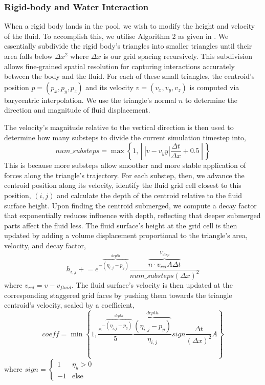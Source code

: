 \subsubsection{Rigid-body and Water Interaction}
When a rigid body lands in the pool, we wish to modify the height and velocity of the fluid.
To accomplish this, we utilise Algorithm 2 as given in \cite{hfluid}.
We essentially subdivide the rigid body's triangles into smaller triangles until their area falls below $\Delta x^2$ where $\Delta x$ is our grid spacing recursively.
This subdivision allows fine-grained spatial resolution for capturing interactions accurately between the body and the fluid.
For each of these small triangles, the centroid's position $p = (p_x, p_y, p_z)$ and its velocity $v = (v_x, v_y, v_z)$ is computed via barycentric interpolation.
We use the triangle's normal $n$ to determine the direction and magnitude of fluid displacement.

The velocity's magnitude relative to the vertical direction is then used to determine how many substeps to divide the current simulation timestep into,
$$num\_substeps = \max\left\{1, \left\lfloor |v- v_y y| \frac{\Delta t}{\Delta x} + 0.5 \right\rfloor\right\}$$
This is because more substeps allow smoother and more stable application of forces along the triangle’s trajectory.
For each substep, then, we advance the centroid position along its velocity, identify the fluid grid cell closest to this position, $(i,j)$ and calculate the depth of the centroid relative to the fluid surface height.
Upon finding the centroid submerged, we compute a decay factor that exponentially reduces influence with depth, reflecting that deeper submerged parts affect the fluid less.
The fluid surface's height at the grid cell is then updated by adding a volume displacement proportional to the triangle’s area, velocity, and decay factor,
$$h_{i,j} \mathrel{+}= e^{-\overbrace{(\eta_{i,j}-p_y)}^{depth}} \frac{\overbrace{n \cdot v_{rel} A \Delta t}^{V_{disp}}}{num\_substeps(\Delta x)^2}$$
where $v_{rel} = v - v_{fluid}$.
The fluid surface's velocity is then updated at the corresponding staggered grid faces by pushing them towards the triangle centroid's velocity, scaled by a coefficient,
$$coeff = \min\left\{1, \frac{e^{-\overbrace{(\eta_{i,j}-p_y)}^{depth}}}5 \frac{\overbrace{(\eta_{i,j}-p_y)}^{depth}}{\eta_{i,j}} sign \frac{\Delta t}{(\Delta x)^2} A \right\}$$
where $sign = \begin{cases}
    1 & \eta_y > 0 \\
    -1 & \text{else}
\end{cases}$

